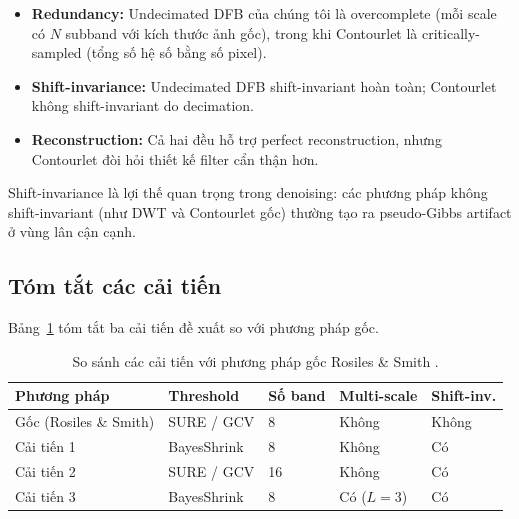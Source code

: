 \begin{itemize}
    \item \textbf{Redundancy:} Undecimated DFB của chúng tôi là overcomplete (mỗi scale có $N$ subband với kích thước ảnh gốc), trong khi Contourlet là critically-sampled (tổng số hệ số bằng số pixel).
    \item \textbf{Shift-invariance:} Undecimated DFB shift-invariant hoàn toàn; Contourlet không shift-invariant do decimation.
    \item \textbf{Reconstruction:} Cả hai đều hỗ trợ perfect reconstruction, nhưng Contourlet đòi hỏi thiết kế filter cẩn thận hơn.
\end{itemize}

Shift-invariance là lợi thế quan trọng trong denoising: các phương pháp không shift-invariant (như DWT và Contourlet gốc) thường tạo ra pseudo-Gibbs artifact ở vùng lân cận cạnh.

\subsection{Tóm tắt các cải tiến}

Bảng~\ref{tab:improvements} tóm tắt ba cải tiến đề xuất so với phương pháp gốc.

\begin{table}[H]
    \centering
    \caption{So sánh các cải tiến với phương pháp gốc Rosiles \& Smith \cite{rosiles2000}.}
    \label{tab:improvements}
    \begin{tabular}{@{}lllll@{}}
        \toprule
        \textbf{Phương pháp} & \textbf{Threshold} & \textbf{Số band} & \textbf{Multi-scale} & \textbf{Shift-inv.} \\
        \midrule
        Gốc (Rosiles \& Smith) & SURE / GCV & 8 & Không & Không \\
        Cải tiến 1 & BayesShrink & 8 & Không & Có \\
        Cải tiến 2 & SURE / GCV & 16 & Không & Có \\
        Cải tiến 3 & BayesShrink & 8 & Có ($L=3$) & Có \\
        \bottomrule
    \end{tabular}
\end{table}
